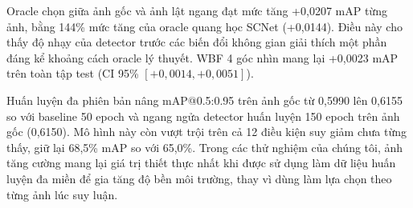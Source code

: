 \documentclass[runningheads]{llncs}
\begin{document}
Oracle chọn giữa ảnh gốc và ảnh lật ngang đạt mức tăng +0,0207 mAP từng ảnh, bằng 144\% mức tăng của oracle quang học SCNet (+0,0144). Điều này cho thấy độ nhạy của detector trước các biến đổi không gian giải thích một phần đáng kể khoảng cách oracle lý thuyết. WBF 4 góc nhìn mang lại +0,0023 mAP trên toàn tập test (CI 95\% $[+0{,}0014, +0{,}0051]$).

Huấn luyện đa phiên bản nâng mAP@0.5:0.95 trên ảnh gốc từ 0,5990 lên 0,6155 so với baseline 50 epoch và ngang ngửa detector huấn luyện 150 epoch trên ảnh gốc (0,6150). Mô hình này còn vượt trội trên cả 12 điều kiện suy giảm chưa từng thấy, giữ lại 68,5\% mAP so với 65,0\%. Trong các thử nghiệm của chúng tôi, ảnh tăng cường mang lại giá trị thiết thực nhất khi được sử dụng làm dữ liệu huấn luyện đa miền để gia tăng độ bền môi trường, thay vì dùng làm lựa chọn theo từng ảnh lúc suy luận.

\enlargethispage{2\baselineskip}
\setlength{\bibitemsep}{0.1ex}
\printbibliography
\end{document}
